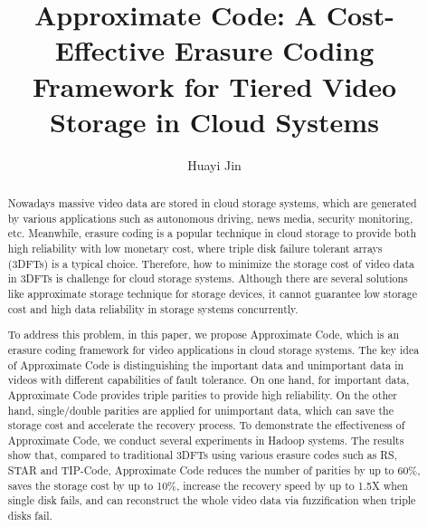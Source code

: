\documentclass[sigconf]{acmart}
\begin{document}
\title{Approximate Code: A Cost-Effective Erasure Coding Framework for Tiered Video Storage in Cloud Systems}

\author{Huayi Jin}



\begin{abstract}
Nowadays massive video data are stored in cloud storage systems, which are generated by various applications such as autonomous driving, news media, security monitoring, etc. Meanwhile, erasure coding is a popular technique in cloud storage to provide both high reliability with low monetary cost, where triple disk failure tolerant arrays (3DFTs) is a typical choice. Therefore, how to minimize the storage cost of video data in 3DFTs is challenge for cloud storage systems. Although there are several solutions like approximate storage technique for storage devices, it cannot guarantee low storage cost and high data reliability in storage systems concurrently.

To address this problem, in this paper, we propose Approximate Code, which is an erasure coding framework for video applications in cloud storage systems. The key idea of Approximate Code is distinguishing the important data and unimportant data in videos with different capabilities of fault tolerance. On one hand, for important data, Approximate Code provides triple parities to provide high reliability. On the other hand, single/double parities are applied for unimportant data, which can save the storage cost and accelerate the recovery process. To demonstrate the effectiveness of Approximate Code, we conduct several experiments in Hadoop systems. The results show that, compared to traditional 3DFTs using various erasure codes such as RS, STAR and TIP-Code, Approximate Code reduces the number of parities by up to 60\%, saves the storage cost by up to 10\%, increase the recovery speed by up to 1.5X when single disk fails, and can reconstruct the whole video data via fuzzification when triple disks fail.

\end{abstract}
\end{document}
